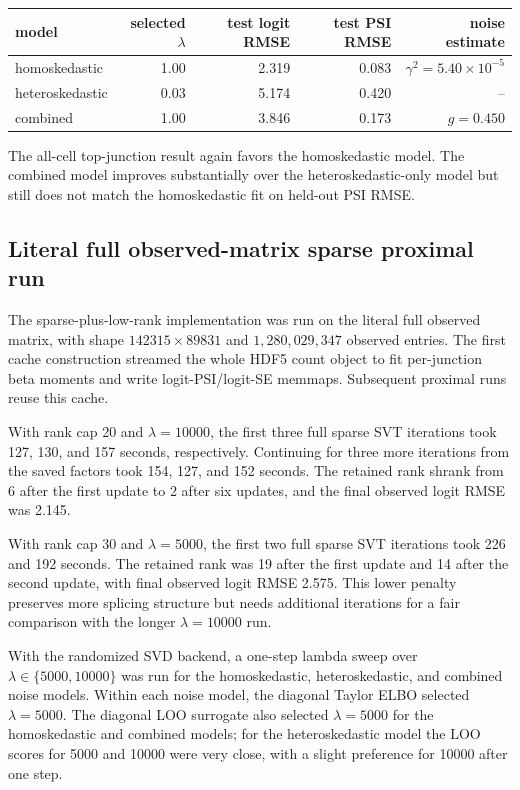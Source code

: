 \documentclass[11pt]{article}
\begin{document}
\begin{center}
\begin{tabular}{lrrrr}
\toprule
model & selected \(\lambda\) & test logit RMSE & test PSI RMSE & noise estimate\\
\midrule
homoskedastic & 1.00 & 2.319 & 0.083 & \(\gamma^2=5.40\times10^{-5}\)\\
heteroskedastic & 0.03 & 5.174 & 0.420 & --\\
combined & 1.00 & 3.846 & 0.173 & \(g=0.450\)\\
\bottomrule
\end{tabular}
\end{center}

The all-cell top-junction result again favors the homoskedastic model.  The
combined model improves substantially over the heteroskedastic-only model but
still does not match the homoskedastic fit on held-out PSI RMSE.

\subsection{Literal full observed-matrix sparse proximal run}

The sparse-plus-low-rank implementation was run on the literal full observed
matrix, with shape \(142315\times 89831\) and \(1{,}280{,}029{,}347\) observed
entries.  The first cache construction streamed the whole HDF5 count object to
fit per-junction beta moments and write logit-PSI/logit-SE memmaps.  Subsequent
proximal runs reuse this cache.

With rank cap 20 and \(\lambda=10000\), the first three full sparse SVT
iterations took 127, 130, and 157 seconds, respectively.  Continuing for three
more iterations from the saved factors took 154, 127, and 152 seconds.  The
retained rank shrank from 6 after the first update to 2 after six updates, and
the final observed logit RMSE was 2.145.

With rank cap 30 and \(\lambda=5000\), the first two full sparse SVT iterations
took 226 and 192 seconds.  The retained rank was 19 after the first update and
14 after the second update, with final observed logit RMSE 2.575.  This lower
penalty preserves more splicing structure but needs additional iterations for a
fair comparison with the longer \(\lambda=10000\) run.

With the randomized SVD backend, a one-step lambda sweep over
\(\lambda\in\{5000,10000\}\) was run for the homoskedastic, heteroskedastic, and
combined noise models.  Within each noise model, the diagonal Taylor ELBO
selected \(\lambda=5000\).  The diagonal LOO surrogate also selected
\(\lambda=5000\) for the homoskedastic and combined models; for the
heteroskedastic model the LOO scores for 5000 and 10000 were very close, with a
slight preference for 10000 after one step.
\end{document}
